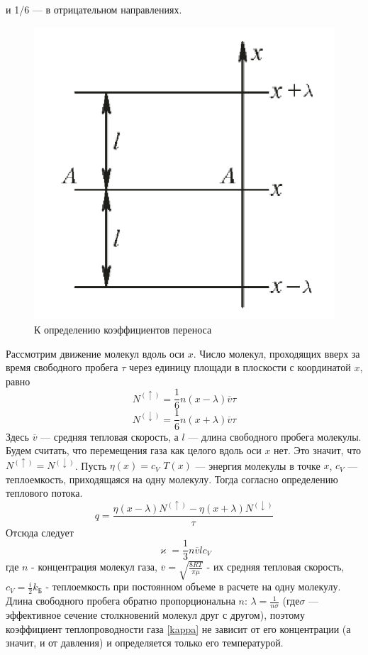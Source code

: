\documentclass[12pt]{article}
\begin{document}
        и 1/6 — в отрицательном направлениях.\\
        \begin{figure}[H]
            \centering
            \includegraphics[width=0.4\linewidth]{furie_image.png}
            \caption{К определению коэффициентов переноса}
            \label{fig:furie}
        \end{figure}
        Рассмотрим движение молекул вдоль оси $x$. Число молекул, проходящих вверх за время свободного пробега $\tau$ через
        единицу площади в плоскости с координатой $x$, равно
        \[ N^{(\uparrow)} = \frac{1}{6}n(x-\lambda) \overline{v} \tau \]
        \[ N^{(\downarrow)} = \frac{1}{6}n(x+\lambda) \overline{v} \tau \]
        Здесь $\overline{v}$ — средняя тепловая скорость, а $l$ — длина свободного пробега молекулы.\\
        Будем считать, что перемещения газа как целого вдоль оси $x$ нет. Это значит, что $N^{(\uparrow)} =  N^{(\downarrow)}$.
        Пусть $\eta(x) = c_V$ $T(x)$ — энергия молекулы в точке $x$, $c_V$ — теплоемкость, приходящаяся на одну молекулу.
        Тогда согласно определению теплового потока.
        \[
            q = \frac{\eta(x-\lambda)N^{(\uparrow)} - \eta(x+\lambda)N^{(\downarrow)}}{\tau}
        \]
        Отсюда следует
        \begin{equation}\label{kappa}
            \varkappa = \frac{1}{3} n \overline{v}lc_V
        \end{equation}
        где $n$ - концентрация молекул газа, $\overline{v} = \sqrt{\frac{8RT}{\pi\mu}}$ - их средняя тепловая скорость,
        $c_V = \frac{i}{2}k_{\text{Б}}$ - теплоемкость при постоянном объеме в расчете на одну молекулу.\\
        Длина свободного пробега обратно пропорциональна $n$: $\lambda = \frac{1}{n\sigma}$ (где$\sigma$ — эффективное
        сечение столкновений молекул друг с другом), поэтому коэффициент теплопроводности газа \ref{kappa} не зависит от его
        концентрации (а значит, и от давления) и определяется только его температурой.
\end{document}
